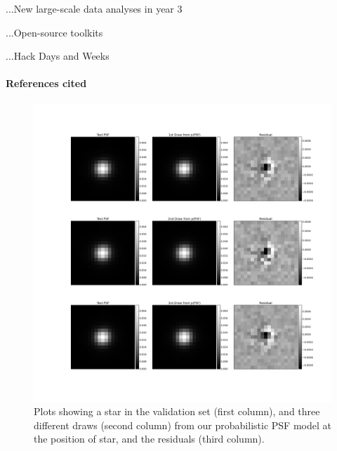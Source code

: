 \documentclass[12pt]{article}
\begin{document}
...New large-scale data analyses in year 3

...Open-source toolkits

...Hack Days and Weeks

\paragraph{References cited}

\clearpage

\begin{figure}[!htb]
  \includegraphics[width=\linewidth]{112.png}
\endminipage
\caption{Plots showing a star in the validation set
(first column), and three different draws (second column)
from our probabilistic PSF model at the
position of star, and the residuals (third column).\label{1}}
\end{figure}
\end{document}
